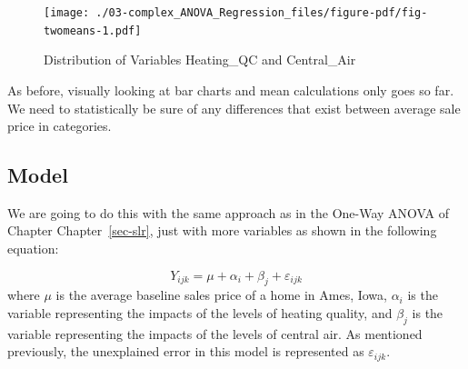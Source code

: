 \documentclass[
  letterpaper,
  DIV=11,
  numbers=noendperiod]{scrreprt}
\newenvironment{Shaded}{\begin{snugshade}}{\end{snugshade}}
\newcommand{\AttributeTok}[1]{\textcolor[rgb]{0.40,0.45,0.13}{#1}}
\newcommand{\DecValTok}[1]{\textcolor[rgb]{0.68,0.00,0.00}{#1}}
\newcommand{\FunctionTok}[1]{\textcolor[rgb]{0.28,0.35,0.67}{#1}}
\newcommand{\NormalTok}[1]{\textcolor[rgb]{0.00,0.23,0.31}{#1}}
\newcommand{\SpecialCharTok}[1]{\textcolor[rgb]{0.37,0.37,0.37}{#1}}
\newcommand{\StringTok}[1]{\textcolor[rgb]{0.13,0.47,0.30}{#1}}
\begin{document}
\begin{Shaded}
\end{Shaded}

\begin{figure}[H]

{\centering \texttt{[image: ./03-complex\_ANOVA\_Regression\_files/figure-pdf/fig-twomeans-1.pdf]}

}

\caption{\label{fig-twomeans}Distribution of Variables Heating\_QC and
Central\_Air}

\end{figure}

As before, visually looking at bar charts and mean calculations only
goes so far. We need to statistically be sure of any differences that
exist between average sale price in categories.

\hypertarget{model}{%
\subsection{Model}\label{model}}

We are going to do this with the same approach as in the One-Way ANOVA
of Chapter Chapter~\ref{sec-slr}, just with more variables as shown in
the following equation:

\[
Y_{ijk} = \mu + \alpha_i + \beta_j + \varepsilon_{ijk}
\] where \(\mu\) is the average baseline sales price of a home in Ames,
Iowa, \(\alpha_i\) is the variable representing the impacts of the
levels of heating quality, and \(\beta_j\) is the variable representing
the impacts of the levels of central air. As mentioned previously, the
unexplained error in this model is represented as \(\varepsilon_{ijk}\).
\end{document}
